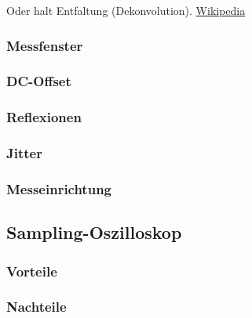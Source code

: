 \documentclass[a4paper, 12pt]{article}
\begin{document}
Oder halt Entfaltung (Dekonvolution).
\href{https://de.wikipedia.org/wiki/Dekonvolution}{Wikipedia}

\subsubsection{Messfenster}

\subsubsection{DC-Offset}

\subsubsection{Reflexionen}

\subsubsection{Jitter}

\subsubsection{Messeinrichtung}

\subsection{Sampling-Oszilloskop}

\subsubsection{Vorteile}
\subsubsection{Nachteile}
 
\end{document}
